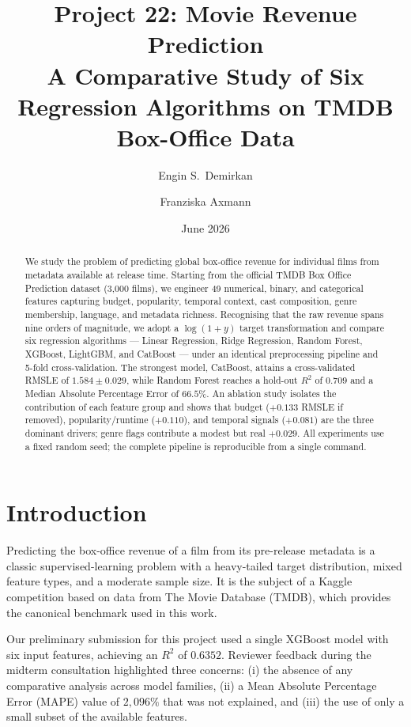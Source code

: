 \documentclass[10pt,a4paper]{article}
\title{\textbf{Project 22: Movie Revenue Prediction}\\
\large A Comparative Study of Six Regression Algorithms on TMDB Box-Office Data}
\author{Engin S.\ Demirkan \and Franziska Axmann}
\date{June 2026}
\begin{document}
\maketitle

\begin{abstract}
We study the problem of predicting global box-office revenue for individual films from
metadata available at release time. Starting from the official TMDB Box Office
Prediction dataset (3{,}000 films), we engineer 49 numerical, binary, and categorical
features capturing budget, popularity, temporal context, cast composition, genre
membership, language, and metadata richness. Recognising that the raw revenue
spans nine orders of magnitude, we adopt a $\log(1{+}y)$ target transformation and
compare six regression algorithms — Linear Regression, Ridge Regression, Random
Forest, XGBoost, LightGBM, and CatBoost — under an identical preprocessing pipeline
and 5-fold cross-validation. The strongest model, CatBoost, attains a
cross-validated RMSLE of $1.584{\pm}0.029$, while Random Forest reaches a hold-out
$R^{2}$ of $0.709$ and a Median Absolute Percentage Error of $66.5\%$. An ablation
study isolates the contribution of each feature group and shows that budget
(\(+0.133\) RMSLE if removed), popularity/runtime (\(+0.110\)), and temporal
signals (\(+0.081\)) are the three dominant drivers; genre flags contribute a
modest but real $+0.029$. All experiments use a fixed random seed; the complete
pipeline is reproducible from a single command.
\end{abstract}

\section{Introduction}

Predicting the box-office revenue of a film from its pre-release metadata is a
classic supervised-learning problem with a heavy-tailed target distribution,
mixed feature types, and a moderate sample size. It is the subject of a Kaggle
competition based on data from The Movie Database (TMDB), which provides the
canonical benchmark used in this work.

Our preliminary submission for this project used a single XGBoost model with six
input features, achieving an $R^{2}$ of $0.6352$. Reviewer feedback during the
midterm consultation highlighted three concerns: (i) the absence of any
comparative analysis across model families, (ii) a Mean Absolute Percentage Error
(MAPE) value of $2{,}096\%$ that was not explained, and (iii) the use of only a
small subset of the available features.
\end{document}
